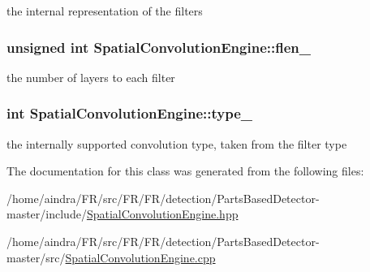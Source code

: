 the internal representation of the filters 

\hypertarget{classSpatialConvolutionEngine_a6f03c3cbd7b42d92e4e83148957d5e16}{
\subsubsection[{flen\-\_\-}]{\setlength{\rightskip}{0pt plus 5cm}unsigned int {\bf \-Spatial\-Convolution\-Engine\-::flen\-\_\-}}}\label{classSpatialConvolutionEngine_a6f03c3cbd7b42d92e4e83148957d5e16}


the number of layers to each filter 

\hypertarget{classSpatialConvolutionEngine_a913adab567840b6d1b2407c3b22ca108}{
\subsubsection[{type\-\_\-}]{\setlength{\rightskip}{0pt plus 5cm}int {\bf \-Spatial\-Convolution\-Engine\-::type\-\_\-}}}\label{classSpatialConvolutionEngine_a913adab567840b6d1b2407c3b22ca108}


the internally supported convolution type, taken from the filter type 



\-The documentation for this class was generated from the following files\-:\begin{DoxyCompactItemize}
\item 
/home/aindra/\-F\-R/src/\-F\-R/\-F\-R/detection/\-Parts\-Based\-Detector-\/master/include/\hyperlink{SpatialConvolutionEngine_8hpp}{\-Spatial\-Convolution\-Engine.\-hpp}\item 
/home/aindra/\-F\-R/src/\-F\-R/\-F\-R/detection/\-Parts\-Based\-Detector-\/master/src/\hyperlink{SpatialConvolutionEngine_8cpp}{\-Spatial\-Convolution\-Engine.\-cpp}\end{DoxyCompactItemize}
